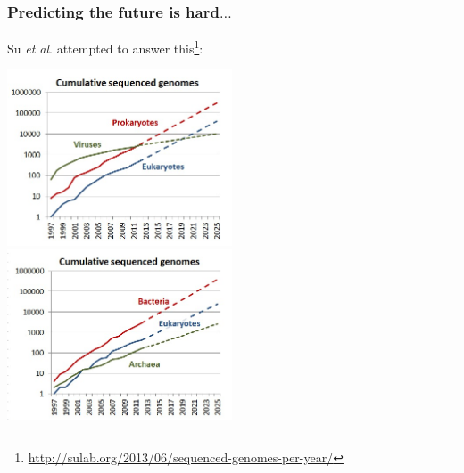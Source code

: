 \begin{frame}
  \frametitle{Predicting the future is hard$\ldots$}
    Su \textit{et al}. attempted to answer this\footnote{\tiny{\href{http://sulab.org/2013/06/sequenced-genomes-per-year/}{http://sulab.org/2013/06/sequenced-genomes-per-year/}}}:
    \begin{center}
      \includegraphics[width=0.5\textwidth]{images/cumulative_sequenced_genomes1}
      \includegraphics[width=0.5\textwidth]{images/cumulative_sequenced_genomes2}
    \end{center}     
\end{frame}

